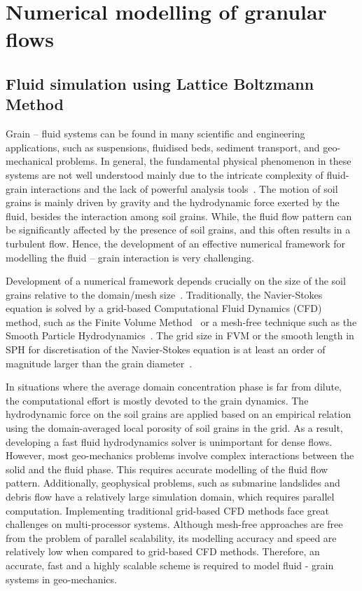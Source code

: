\chapter{Numerical modelling of granular flows}

\ifpdf
    \graphicspath{{Chapter3/figs/raster/}{Chapter3/figs/pdf/}{Chapter3/figs/}}
\else
    \graphicspath{{Chapter3/figs/vector/}{Chapter3/figs/}}
\fi


\section{Fluid simulation using Lattice Boltzmann Method}

Grain -- fluid systems can be found in many scientific and 
engineering applications, such as suspensions, fluidised beds, 
sediment transport, and geo-mechanical problems. In general, 
the fundamental physical phenomenon in these systems are not 
well understood mainly due to the intricate complexity of 
fluid-grain interactions and the lack of powerful analysis 
tools~\citep{Han2007b}. The motion of soil grains is mainly 
driven by gravity and the hydrodynamic force exerted by the 
fluid, besides the interaction among soil grains. While, the 
fluid flow pattern can be significantly affected by the 
presence of soil grains, and this often results in a turbulent 
flow. Hence, the development of an effective numerical 
framework for modelling the fluid -- grain interaction is very challenging.

Development of a numerical framework depends crucially on the 
size of the soil grains relative to the domain/mesh 
size~\citep{Feng2007}. Traditionally, the Navier-Stokes 
equation is solved by a grid-based Computational Fluid Dynamics 
(CFD) method, such as the Finite Volume 
Method~\citep{Capecelatro2013} or a mesh-free technique such as 
the Smooth Particle Hydrodynamics~\citep{Sun2013}. The grid 
size in FVM or the smooth length in SPH for discretisation of 
the Navier-Stokes equation is at least an order of magnitude 
larger than the grain diameter~\citep{Xiong2014}. 

In situations where the average domain concentration phase is 
far from dilute, the computational effort is mostly devoted to 
the grain dynamics. The hydrodynamic force on the soil grains 
are applied based on an empirical relation using the 
domain-averaged local porosity of soil grains in the grid. 
As a result, developing a fast fluid hydrodynamics solver is 
unimportant for dense flows. However, most geo-mechanics 
problems involve complex interactions between the solid and the 
fluid phase. This requires accurate modelling of the 
fluid flow pattern. Additionally, geophysical problems, such as 
submarine landslides and debris flow have a relatively large 
simulation domain, which requires parallel computation. 
Implementing traditional grid-based CFD methods 
face great challenges on multi-processor systems. Although 
mesh-free approaches are free from the problem of parallel 
scalability, its modelling accuracy and speed are relatively 
low when compared to grid-based CFD methods. Therefore, an 
accurate, fast and a highly scalable scheme is required 
to model fluid - grain systems in geo-mechanics. 
 
